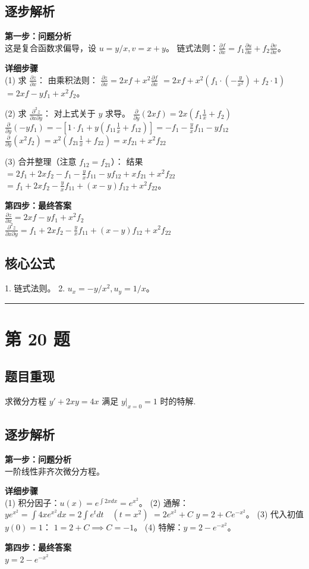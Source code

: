 \documentclass[10pt, a4paper]{ctexart}
\newcommand{\problemheader}{
    \vspace{0.5cm}
    \noindent\rule[0.5ex]{\linewidth}{2pt} %
}
\newcommand{\analysisheader}{
    \vspace{0.2cm}
    \noindent{\color{red}\rule[0.5ex]{\linewidth}{0.5pt}} %
    \vspace{0.1cm}
}
\begin{document}
\analysisheader
{\color{red}
\subsection*{逐步解析}
\textbf{第一步：问题分析} \\
这是复合函数求偏导，设 $u = y/x, v = x+y$。
链式法则：$\frac{\partial f}{\partial x} = f_1 \frac{\partial u}{\partial x} + f_2 \frac{\partial v}{\partial x}$。

\textbf{详细步骤} \\
(1) 求 $\frac{\partial z}{\partial x}$：
由乘积法则：
$\frac{\partial z}{\partial x} = 2x f + x^2 \frac{\partial f}{\partial x}$
$= 2x f + x^2 \left( f_1 \cdot (-\frac{y}{x^2}) + f_2 \cdot 1 \right)$
$= 2x f - y f_1 + x^2 f_2$。

(2) 求 $\frac{\partial^2 z}{\partial x \partial y}$：
对上式关于 $y$ 求导。
$\frac{\partial}{\partial y}(2x f) = 2x (f_1 \frac{1}{x} + f_2)$
$\frac{\partial}{\partial y}(-y f_1) = - [ 1 \cdot f_1 + y (f_{11} \frac{1}{x} + f_{12}) ] = -f_1 - \frac{y}{x} f_{11} - y f_{12}$
$\frac{\partial}{\partial y}(x^2 f_2) = x^2 (f_{21} \frac{1}{x} + f_{22}) = x f_{21} + x^2 f_{22}$

(3) 合并整理（注意 $f_{12} = f_{21}$）：
结果 $= 2f_1 + 2x f_2 - f_1 - \frac{y}{x}f_{11} - y f_{12} + x f_{21} + x^2 f_{22}$
$= f_1 + 2x f_2 - \frac{y}{x} f_{11} + (x-y)f_{12} + x^2 f_{22}$。

\textbf{第四步：最终答案} \\
$\frac{\partial z}{\partial x} = 2x f - y f_1 + x^2 f_2$ \\
$\frac{\partial^2 z}{\partial x \partial y} = f_1 + 2x f_2 - \frac{y}{x} f_{11} + (x-y)f_{12} + x^2 f_{22}$

\subsection*{核心公式}
1. 链式法则。
2. $u_x = -y/x^2, u_y = 1/x$。
}

\problemheader
\section*{第 20 题}
\subsection*{题目重现}
求微分方程 $y' + 2xy = 4x$ 满足 $y|_{x=0} = 1$ 时的特解.

\analysisheader
{\color{red}
\subsection*{逐步解析}
\textbf{第一步：问题分析} \\
一阶线性非齐次微分方程。

\textbf{详细步骤} \\
(1) 积分因子：$u(x) = e^{\int 2x dx} = e^{x^2}$。
(2) 通解：
$y e^{x^2} = \int 4x e^{x^2} dx = 2 \int e^{t} dt \quad (t=x^2)$
$= 2 e^{x^2} + C$
$y = 2 + C e^{-x^2}$。
(3) 代入初值 $y(0)=1$：
$1 = 2 + C \implies C = -1$。
(4) 特解：$y = 2 - e^{-x^2}$。

\textbf{第四步：最终答案} \\
$y = 2 - e^{-x^2}$
}
\end{document}
